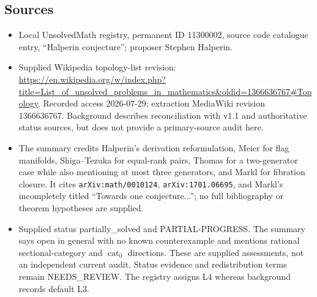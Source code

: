 \documentclass[11pt]{article}
\begin{document}
\subsection{Sources}
\begin{itemize}
\item Local UnsolvedMath registry, permanent ID 11300002, source code catalogue entry, ``Halperin conjecture''; proposer Stephen Halperin.
\item Supplied Wikipedia topology-list revision: \url{https://en.wikipedia.org/w/index.php?title=List_of_unsolved_problems_in_mathematics&oldid=1366636767#Topology}. Recorded access 2026-07-29; extraction MediaWiki revision 1366636767. Background describes reconciliation with v1.1 and authoritative status sources, but does not provide a primary-source audit here.
\item The summary credits Halperin's derivation reformulation, Meier for flag manifolds, Shiga--Tezuka for equal-rank pairs, Thomas for a two-generator case while also mentioning at most three generators, and Markl for fibration closure. It cites \texttt{arXiv:math/0010124}, \texttt{arXiv:1701.06695}, and Markl's incompletely titled ``Towards one conjecture...''; no full bibliography or theorem hypotheses are supplied.
\item Supplied status partially\_solved and PARTIAL-PROGRESS. The summary says open in general with no known counterexample and mentions rational sectional-category and \(\operatorname{cat}_0\) directions. These are supplied assessments, not an independent current audit. Status evidence and redistribution terms remain NEEDS\_REVIEW. The registry assigns L4 whereas background records default L3.
\end{itemize}
\end{document}
